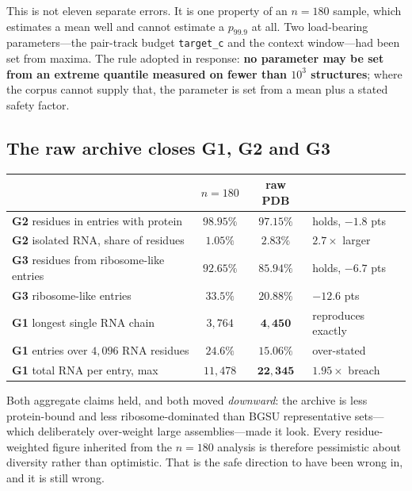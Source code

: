 \documentclass[11pt,a4paper]{article}
\begin{document}
\noindent
This is not eleven separate errors. It is one property of an $n=180$ sample,
which estimates a mean well and cannot estimate a $p_{99.9}$ at all. Two
load-bearing parameters---the pair-track budget \texttt{target\_c} and the
context window---had been set from maxima. The rule adopted in response:
\textbf{no parameter may be set from an extreme quantile measured on fewer than
$10^3$ structures}; where the corpus cannot supply that, the parameter is set
from a mean plus a stated safety factor.

\subsection{The raw archive closes G1, G2 and G3}

\begin{table}[h]
\centering
\small
\begin{tabular}{lccl}
\toprule
& \textbf{$n=180$} & \textbf{raw PDB} & \\
\midrule
\textbf{G2} residues in entries with protein   & $98.95\%$ & $\mathbf{97.15\%}$ & holds, $-1.8$ pts \\
\textbf{G2} isolated RNA, share of residues    & $1.05\%$  & $\mathbf{2.83\%}$  & $2.7\times$ larger \\
\textbf{G3} residues from ribosome-like entries& $92.65\%$ & $\mathbf{85.94\%}$ & holds, $-6.7$ pts \\
\textbf{G3} ribosome-like entries              & $33.5\%$  & $\mathbf{20.88\%}$ & $-12.6$ pts \\
\textbf{G1} longest single RNA chain           & $3{,}764$ & $\mathbf{4{,}450}$ & reproduces exactly \\
\textbf{G1} entries over $4{,}096$ RNA residues& $24.6\%$  & $\mathbf{15.06\%}$ & over-stated \\
\textbf{G1} total RNA per entry, max           & $11{,}478$& $\mathbf{22{,}345}$& $1.95\times$ breach \\
\bottomrule
\end{tabular}
\end{table}

\noindent
Both aggregate claims held, and both moved \emph{downward}: the archive is less
protein-bound and less ribosome-dominated than BGSU representative sets---which
deliberately over-weight large assemblies---made it look. Every residue-weighted
figure inherited from the $n=180$ analysis is therefore pessimistic about
diversity rather than optimistic. That is the safe direction to have been wrong
in, and it is still wrong.
\end{document}
